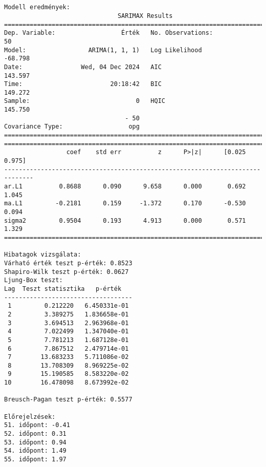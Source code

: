 \documentclass[11pt]{article}
\begin{document}
    \begin{center}
    \end{center}
    { \hspace*{\fill} \\}
    
    \begin{Verbatim}[commandchars=\\\{\}]

Modell eredmények:
                               SARIMAX Results
==============================================================================
Dep. Variable:                  Érték   No. Observations:                   50
Model:                 ARIMA(1, 1, 1)   Log Likelihood                 -68.798
Date:                Wed, 04 Dec 2024   AIC                            143.597
Time:                        20:18:42   BIC                            149.272
Sample:                             0   HQIC                           145.750
                                 - 50
Covariance Type:                  opg
==============================================================================
==============================================================================
                 coef    std err          z      P>|z|      [0.025      0.975]
------------------------------------------------------------------------------
ar.L1          0.8688      0.090      9.658      0.000       0.692       1.045
ma.L1         -0.2181      0.159     -1.372      0.170      -0.530       0.094
sigma2         0.9504      0.193      4.913      0.000       0.571       1.329
==============================================================================

Hibatagok vizsgálata:
Várható érték teszt p-érték: 0.8523
Shapiro-Wilk teszt p-érték: 0.0627
Ljung-Box teszt:
Lag  Teszt statisztika   p-érték
-----------------------------------
 1         0.212220   6.450331e-01
 2         3.389275   1.836658e-01
 3         3.694513   2.963968e-01
 4         7.022499   1.347040e-01
 5         7.781213   1.687128e-01
 6         7.867512   2.479714e-01
 7        13.683233   5.711086e-02
 8        13.708309   8.969225e-02
 9        15.190585   8.583220e-02
10        16.478098   8.673992e-02

Breusch-Pagan teszt p-érték: 0.5577

Előrejelzések:
51. időpont: -0.41
52. időpont: 0.31
53. időpont: 0.94
54. időpont: 1.49
55. időpont: 1.97
    \end{Verbatim}
\end{document}

